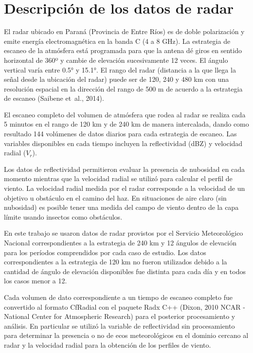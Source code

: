 \documentclass[12pt,spanish,oneside, a4paper]{book}
\begin{document}
\section{Descripción de los datos de
radar}\label{descripcion-de-los-datos-de-radar}

El radar ubicado en Paraná (Provincia de Entre Ríos) es de doble
polarización y emite energía electromagnética en la banda C (4 a 8 GHz).
La estrategia de escaneo de la atmósfera está programada para que la
antena dé giros en sentido horizontal de 360º y cambie de elevación
sucesivamente 12 veces. El ángulo vertical varía entre 0.5° y 15.1°. El
rango del radar (distancia a la que llega la señal desde la ubicación
del radar) puede ser de 120, 240 y 480 km con una resolución espacial en
la dirección del rango de 500 m de acuerdo a la estrategia de escaneo
(Saibene et~al., 2014).

El escaneo completo del volumen de atmósfera que rodea al radar se
realiza cada 5 minutos en el rango de 120 km y de 240 km de manera
intercalada, dando como resultado 144 volúmenes de datos diarios para
cada estrategia de escaneo. Las variables disponibles en cada tiempo
incluyen la reflectividad (dBZ) y velocidad radial (\(V_r\)).

Los datos de reflectividad permitieron evaluar la presencia de nubosidad
en cada momento mientras que la velocidad radial se utilizó para
calcular el perfil de viento. La velocidad radial medida por el radar
corresponde a la velocidad de un objetivo u obstáculo en el camino del
haz. En situaciones de aire claro (sin nubosidad) es posible tener una
medida del campo de viento dentro de la capa límite usando insectos como
obstáculos.

En este trabajo se usaron datos de radar provistos por el Servicio
Meteorológico Nacional correspondientes a la estrategia de 240 km y 12
ángulos de elevación para los períodos comprendidos por cada caso de
estudio. Los datos correspondientes a la estrategia de 120 km no fueron
utilizados debido a la cantidad de ángulo de elevación disponibles fue
distinta para cada día y en todos los casos menor a 12.

Cada volumen de dato correspondiente a un tiempo de escaneo completo fue
convertido al formato CfRadial con el paquete Radx C++ (Dixon, 2010 NCAR
- National Center for Atmospheric Research) para el posterior
procesamiento y análisis. En particular se utilizó la variable de
reflectividad sin procesamiento para determinar la presencia o no de
ecos meteorológicos en el dominio cercano al radar y la velocidad radial
para la obtención de los perfiles de viento.
\end{document}
